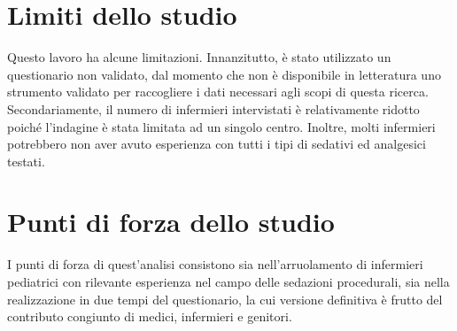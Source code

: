 \section{Limiti dello studio}
Questo lavoro ha alcune limitazioni. Innanzitutto, è stato utilizzato un questionario non validato, dal momento che non è disponibile in letteratura uno strumento validato per raccogliere i dati necessari agli scopi di questa ricerca. Secondariamente, il numero di infermieri intervistati è relativamente ridotto poiché l'indagine è stata limitata ad un singolo centro. Inoltre, molti infermieri potrebbero non aver avuto esperienza con tutti i tipi di sedativi ed analgesici testati. 

\section{Punti di forza dello studio}
I punti di forza di quest'analisi consistono sia nell'arruolamento di infermieri pediatrici con rilevante esperienza nel campo delle sedazioni procedurali, sia nella realizzazione in due tempi del questionario, la cui versione definitiva è frutto del contributo congiunto di medici, infermieri e genitori. 